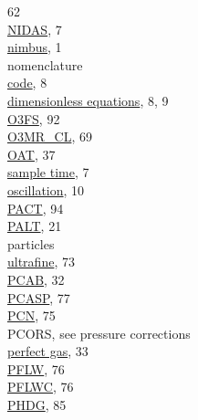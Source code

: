 \documentclass[
]{article}
\begin{document}
62\\
\href{./1-introduction.html}{NIDAS}, 7\\
\href{./1-introduction.html}{nimbus}, 1\\
nomenclature\\
\hspace*{0.333em}\hspace*{0.333em}\href{./2-general-information-about-data-files.html\#variable-names-in-equations}{code},
8\\
\hspace*{0.333em}\hspace*{0.333em}\href{./2-general-information-about-data-files.html\#dimensions-in-equations}{dimensionless
equations}, 8, 9\\
\href{./10-obsolete-variables.html\#o3fs}{O3FS}, 92\\
\href{./6-air-chemistry-measurements.html\#f03-acd\%7C}{O3MR\_CL}, 69\\
\href{./4-the-state-of-the-atmosphere.html\#oat\%7C}{OAT}, 37\\
\href{./2-general-information-about-data-files.html\#synchronization-of-measurements}{sample
time}, 7\\
\href{./2-general-information-about-data-files.html\#bpitchr}{oscillation},
10\\
\href{./10-obsolete-variables.html\#AACT}{PACT}, 94\\
\href{./3-the-state-of-the-aircraft.html\#palt}{PALT}, 21\\
particles\\
\hspace*{0.333em}\hspace*{0.333em}\href{./7-aerosol-particle-measurements.html\#condensation-nucleus-counter}{ultrafine},
73\\
\href{./4-the-state-of-the-atmosphere.html\#p-special}{PCAB}, 32\\
\href{./7-aerosol-particle-measurements.html\#aerosol-spec}{PCASP}, 77\\
\href{./7-aerosol-particle-measurements.html\#pcn}{PCN}, 75\\
PCORS, see pressure corrections\\
\href{./3-the-state-of-the-aircraft.html\#ATX}{perfect gas}, 33\\
\href{./7-aerosol-particle-measurements.html\#pflw}{PFLW}, 76\\
\href{./7-aerosol-particle-measurements.html\#pflw}{PFLWC}, 76\\
\href{./10-obsolete-variables.html\#ltn51}{PHDG}, 85\\
\end{document}
